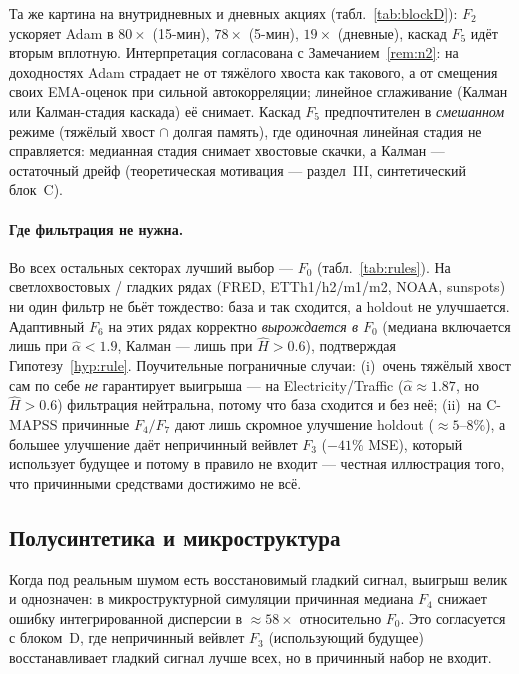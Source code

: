 \documentclass[conference]{IEEEtran}
\theoremstyle{plain}
\theoremstyle{definition}
\begin{document}


Та же картина на внутридневных и дневных акциях (табл.~\ref{tab:blockD}):
$F_2$ ускоряет Adam в $80\times$ (15-мин), $78\times$ (5-мин),
$19\times$ (дневные), каскад $F_5$ идёт вторым вплотную. Интерпретация
согласована с Замечанием~\ref{rem:n2}: на доходностях Adam страдает не
от тяжёлого хвоста как такового, а от смещения своих EMA-оценок при
сильной автокорреляции; линейное сглаживание (Калман или Калман-стадия
каскада) её снимает. Каскад $F_5$ предпочтителен в \emph{смешанном}
режиме (тяжёлый хвост $\cap$ долгая память), где одиночная линейная
стадия не справляется: медианная стадия снимает хвостовые скачки, а
Калман --- остаточный дрейф (теоретическая мотивация --- раздел~III,
синтетический блок~C).

\paragraph*{Где фильтрация не нужна.} Во всех остальных секторах лучший
выбор --- $F_0$ (табл.~\ref{tab:rules}). На светлохвостовых / гладких
рядах (FRED, ETTh1/h2/m1/m2, NOAA, sunspots) ни один фильтр не бьёт
тождество: база и так сходится, а holdout не улучшается. Адаптивный
$F_6$ на этих рядах корректно \emph{вырождается в $F_0$} (медиана
включается лишь при $\hat\alpha<1.9$, Калман --- лишь при $\hat H>0.6$),
подтверждая Гипотезу~\ref{hyp:rule}. Поучительные пограничные случаи:
(i)~очень тяжёлый хвост сам по себе \emph{не} гарантирует выигрыша ---
на Electricity/Traffic ($\hat\alpha\approx1.87$, но $\hat H>0.6$)
фильтрация нейтральна, потому что база сходится и без неё;
(ii)~на C-MAPSS причинные $F_4/F_7$ дают лишь скромное улучшение holdout
($\approx5$--$8\%$), а большее улучшение даёт непричинный вейвлет $F_3$ ($-41\%$ MSE),
который использует будущее и потому в правило не входит --- честная
иллюстрация того, что причинными средствами достижимо не всё.

\subsection{Полусинтетика и микроструктура}
Когда под реальным шумом есть восстановимый гладкий сигнал, выигрыш
велик и однозначен: в микроструктурной симуляции причинная медиана
$F_4$ снижает ошибку интегрированной дисперсии в $\approx58\times$
относительно $F_0$. Это согласуется с блоком~D, где непричинный вейвлет $F_3$ (использующий
будущее) восстанавливает гладкий сигнал лучше всех, но в причинный
набор не входит.
\end{document}

